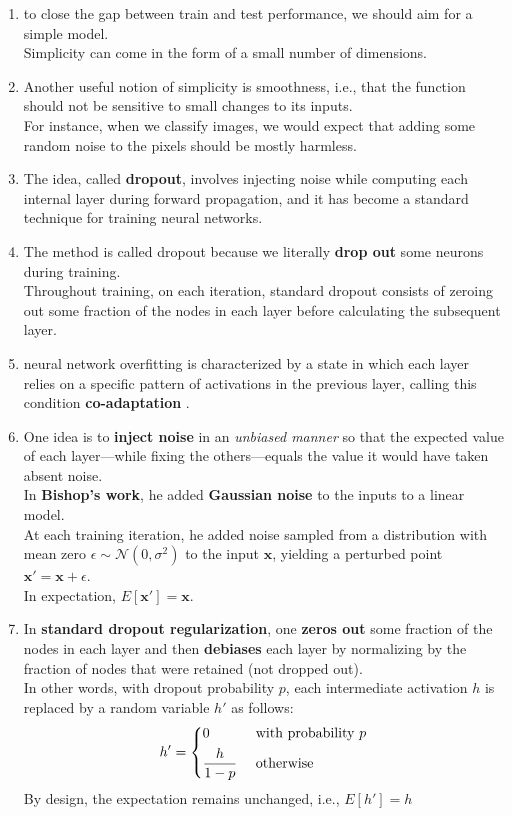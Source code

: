 \begin{enumerate}
    \item to close the gap between train and test performance, we should aim for a simple model.\\ 
    Simplicity can come in the form of a small number of dimensions.

    \item Another useful notion of simplicity is smoothness, i.e., that the function should not be sensitive to small changes to its inputs.\\
    For instance, when we classify images, we would expect that adding some random noise to the pixels should be mostly harmless.

    \item The idea, called \textbf{dropout}, involves injecting noise while computing each internal layer during forward propagation, and it has become a standard technique for training neural networks. 
    
    \item The method is called dropout because we literally \textbf{drop out} some neurons during training.\\
    Throughout training, on each iteration, standard dropout consists of zeroing out some fraction of the nodes in each layer before calculating the subsequent layer.

    \item neural network overfitting is characterized by a state in which each layer relies on a specific pattern of activations in the previous layer, calling this condition \textbf{co-adaptation} .

    \item One idea is to \textbf{inject noise} in an \textit{unbiased manner} so that the expected value of each layer—while fixing the others—equals the value it would have taken absent noise.\\
    In \textbf{Bishop’s work}, he added \textbf{Gaussian noise} to the inputs to a linear model.\\
    At each training iteration, he added noise sampled from a distribution with mean zero $\epsilon \sim \mathcal{N}(0,\sigma^2)$ to the input $\mathbf{x}$, yielding a perturbed point $\mathbf{x}' = \mathbf{x} + \epsilon$. \\
    In expectation, $E[\mathbf{x}'] = \mathbf{x}$.

    \item In \textbf{standard dropout regularization}, one \textbf{zeros out} some fraction of the nodes in each layer and then \textbf{debiases} each layer by normalizing by the fraction of nodes that were retained (not dropped out).\\
    In other words, with dropout probability $p$, each intermediate activation $h$ is replaced by a random variable $h'$ as follows:
    \[
        h' =
        \begin{dcases}
            0 & \textrm{ with probability } p \\
            \dfrac{h}{1-p} & \textrm{ otherwise}
        \end{dcases}
    \]
    By design, the expectation remains unchanged, i.e., $E[h'] = h$


\end{enumerate}
